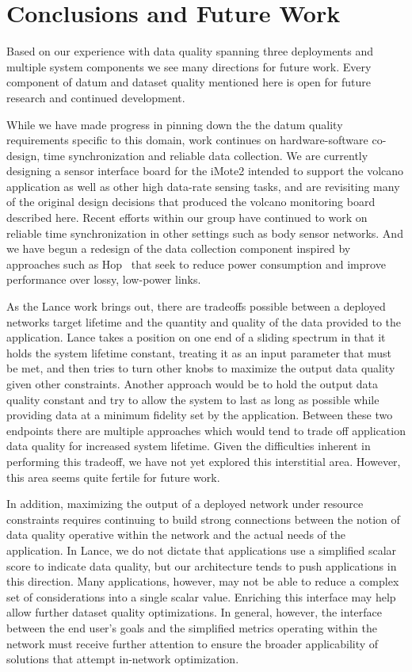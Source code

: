 \section{Conclusions and Future Work}
\label{sec-conclusions}

Based on our experience with data quality spanning three deployments and
multiple system components we see many directions for future work.  Every
component of datum and dataset quality mentioned here is open for future
research and continued development.

While we have made progress in pinning down the the datum quality
requirements specific to this domain, work continues on hardware-software
co-design, time synchronization and reliable data collection.  We are
currently designing a sensor interface board for the iMote2 intended to
support the volcano application as well as other high data-rate sensing
tasks, and are revisiting many of the original design decisions that produced
the volcano monitoring board described here.  Recent efforts within our group
have continued to work on reliable time synchronization in other settings
such as body sensor networks.  And we have begun a redesign of the data
collection component inspired by approaches such as Hop~\cite{hop-nsdi09}
that seek to reduce power consumption and improve performance over lossy,
low-power links.

As the Lance work brings out, there are tradeoffs possible between a deployed
networks target lifetime and the quantity and quality of the data provided to
the application. Lance takes a position on one end of a sliding spectrum in
that it holds the system lifetime constant, treating it as an input parameter
that must be met, and then tries to turn other knobs to maximize the output
data quality given other constraints. Another approach would be to hold the
output data quality constant and try to allow the system to last as long as
possible while providing data at a minimum fidelity set by the application.
Between these two endpoints there are multiple approaches which would tend to
trade off application data quality for increased system lifetime. Given the
difficulties inherent in performing this tradeoff, we have not yet explored
this interstitial area. However, this area seems quite fertile for future
work.

In addition, maximizing the output of a deployed network under resource
constraints requires continuing to build strong connections between the
notion of data quality operative within the network and the actual needs of
the application. In Lance, we do not dictate that applications use a
simplified scalar score to indicate data quality, but our architecture tends
to push applications in this direction. Many applications, however, may not
be able to reduce a complex set of considerations into a single scalar value.
Enriching this interface may help allow further dataset quality
optimizations. In general, however, the interface between the end user's
goals and the simplified metrics operating within the network must receive
further attention to ensure the broader applicability of solutions that
attempt in-network optimization.

